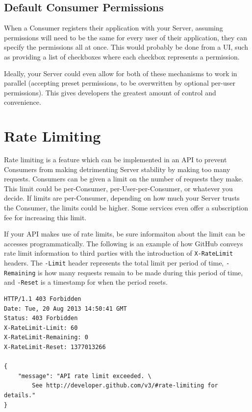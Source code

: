 \documentclass{book}
\begin{document}
\subsection{Default Consumer Permissions}

When a Consumer registers their application with your Server, assuming permissions will need to be the same for every user of their application, they can specify the permissions all at once. This would probably be done from a UI, such as providing a list of checkboxes where each checkbox represents a permission.

Ideally, your Server could even allow for both of these mechanisms to work in parallel (accepting preset permissions, to be overwritten by optional per-user permissions). This gives developers the greatest amount of control and convenience.


\section{Rate Limiting}

Rate limiting is a feature which can be implemented in an API to prevent Consumers from making detrimenting Server stability by making too many requests. Consumers can be given a limit on the number of requests they make. This limit could be per-Consumer, per-User-per-Consumer, or whatever you decide. If limits are per-Consumer, depending on how much your Server trusts the Consumer, the limits could be higher. Some services even offer a subscription fee for increasing this limit.

If your API makes use of rate limits, be sure informaiton about the limit can be accesses programmatically. The following is an example of how GitHub conveys rate limit information to third parties with the introduction of \texttt{X-RateLimit} headers. The \texttt{-Limit} header represents the total limit per period of time, \texttt{-Remaining} is how many requests remain to be made during this period of time, and \texttt{-Reset} is a timestamp for when the period resets.

\begin{verbatim}
HTTP/1.1 403 Forbidden
Date: Tue, 20 Aug 2013 14:50:41 GMT
Status: 403 Forbidden
X-RateLimit-Limit: 60
X-RateLimit-Remaining: 0
X-RateLimit-Reset: 1377013266

{
    "message": "API rate limit exceeded. \
        See http://developer.github.com/v3/#rate-limiting for details."
}
\end{verbatim}
\end{document}
